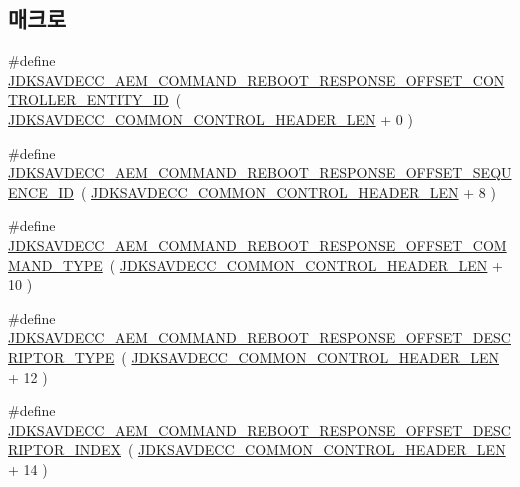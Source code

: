 \subsection*{매크로}
\begin{DoxyCompactItemize}
\item 
\#define \hyperlink{group__command__reboot__response_ga68724f183e2c6483cc52e6d6253a0837}{J\+D\+K\+S\+A\+V\+D\+E\+C\+C\+\_\+\+A\+E\+M\+\_\+\+C\+O\+M\+M\+A\+N\+D\+\_\+\+R\+E\+B\+O\+O\+T\+\_\+\+R\+E\+S\+P\+O\+N\+S\+E\+\_\+\+O\+F\+F\+S\+E\+T\+\_\+\+C\+O\+N\+T\+R\+O\+L\+L\+E\+R\+\_\+\+E\+N\+T\+I\+T\+Y\+\_\+\+ID}~( \hyperlink{group__jdksavdecc__avtp__common__control__header_gaae84052886fb1bb42f3bc5f85b741dff}{J\+D\+K\+S\+A\+V\+D\+E\+C\+C\+\_\+\+C\+O\+M\+M\+O\+N\+\_\+\+C\+O\+N\+T\+R\+O\+L\+\_\+\+H\+E\+A\+D\+E\+R\+\_\+\+L\+EN} + 0 )
\item 
\#define \hyperlink{group__command__reboot__response_gabcd621a15525f58265b8b851990e04d5}{J\+D\+K\+S\+A\+V\+D\+E\+C\+C\+\_\+\+A\+E\+M\+\_\+\+C\+O\+M\+M\+A\+N\+D\+\_\+\+R\+E\+B\+O\+O\+T\+\_\+\+R\+E\+S\+P\+O\+N\+S\+E\+\_\+\+O\+F\+F\+S\+E\+T\+\_\+\+S\+E\+Q\+U\+E\+N\+C\+E\+\_\+\+ID}~( \hyperlink{group__jdksavdecc__avtp__common__control__header_gaae84052886fb1bb42f3bc5f85b741dff}{J\+D\+K\+S\+A\+V\+D\+E\+C\+C\+\_\+\+C\+O\+M\+M\+O\+N\+\_\+\+C\+O\+N\+T\+R\+O\+L\+\_\+\+H\+E\+A\+D\+E\+R\+\_\+\+L\+EN} + 8 )
\item 
\#define \hyperlink{group__command__reboot__response_ga7e5a7cbc4b618e86860701acd259c2f2}{J\+D\+K\+S\+A\+V\+D\+E\+C\+C\+\_\+\+A\+E\+M\+\_\+\+C\+O\+M\+M\+A\+N\+D\+\_\+\+R\+E\+B\+O\+O\+T\+\_\+\+R\+E\+S\+P\+O\+N\+S\+E\+\_\+\+O\+F\+F\+S\+E\+T\+\_\+\+C\+O\+M\+M\+A\+N\+D\+\_\+\+T\+Y\+PE}~( \hyperlink{group__jdksavdecc__avtp__common__control__header_gaae84052886fb1bb42f3bc5f85b741dff}{J\+D\+K\+S\+A\+V\+D\+E\+C\+C\+\_\+\+C\+O\+M\+M\+O\+N\+\_\+\+C\+O\+N\+T\+R\+O\+L\+\_\+\+H\+E\+A\+D\+E\+R\+\_\+\+L\+EN} + 10 )
\item 
\#define \hyperlink{group__command__reboot__response_gaa1fbffdbca1ea956d6c5edbdc482e432}{J\+D\+K\+S\+A\+V\+D\+E\+C\+C\+\_\+\+A\+E\+M\+\_\+\+C\+O\+M\+M\+A\+N\+D\+\_\+\+R\+E\+B\+O\+O\+T\+\_\+\+R\+E\+S\+P\+O\+N\+S\+E\+\_\+\+O\+F\+F\+S\+E\+T\+\_\+\+D\+E\+S\+C\+R\+I\+P\+T\+O\+R\+\_\+\+T\+Y\+PE}~( \hyperlink{group__jdksavdecc__avtp__common__control__header_gaae84052886fb1bb42f3bc5f85b741dff}{J\+D\+K\+S\+A\+V\+D\+E\+C\+C\+\_\+\+C\+O\+M\+M\+O\+N\+\_\+\+C\+O\+N\+T\+R\+O\+L\+\_\+\+H\+E\+A\+D\+E\+R\+\_\+\+L\+EN} + 12 )
\item 
\#define \hyperlink{group__command__reboot__response_ga8c653f1c5ce721d275075fb0a5070339}{J\+D\+K\+S\+A\+V\+D\+E\+C\+C\+\_\+\+A\+E\+M\+\_\+\+C\+O\+M\+M\+A\+N\+D\+\_\+\+R\+E\+B\+O\+O\+T\+\_\+\+R\+E\+S\+P\+O\+N\+S\+E\+\_\+\+O\+F\+F\+S\+E\+T\+\_\+\+D\+E\+S\+C\+R\+I\+P\+T\+O\+R\+\_\+\+I\+N\+D\+EX}~( \hyperlink{group__jdksavdecc__avtp__common__control__header_gaae84052886fb1bb42f3bc5f85b741dff}{J\+D\+K\+S\+A\+V\+D\+E\+C\+C\+\_\+\+C\+O\+M\+M\+O\+N\+\_\+\+C\+O\+N\+T\+R\+O\+L\+\_\+\+H\+E\+A\+D\+E\+R\+\_\+\+L\+EN} + 14 )

\end{DoxyCompactItemize}
